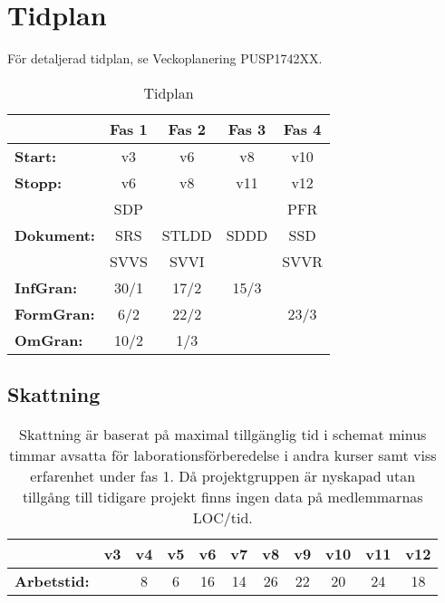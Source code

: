 \documentclass[paper=a4, fontsize=11pt,twoside]{article}
\begin{document}
\section{Tidplan}
För detaljerad tidplan, se Veckoplanering PUSP1742XX. %

\begin{table}[H]
\centering
\begin{tabular}{| l | c | c | c | c |} %
\hline
 & \textbf{Fas 1} & \textbf{Fas 2} & \textbf{Fas 3} & \textbf{Fas 4}\\
\hline
\hline
\textbf{Start:} & v3 & v6 & v8 & v10 \\
\hline
\textbf{Stopp:} & v6 & v8 & v11 & v12 \\
\hline
 				& SDP & & & PFR \\
\textbf{Dokument:} & SRS & STLDD & SDDD & SSD \\
 				& SVVS & SVVI & & SVVR \\
\hline
\textbf{InfGran:} & 30/1 & 17/2 & 15/3 & 	 \\
\hline
\textbf{FormGran:} & 6/2 & 22/2 &	 & 23/3 \\
\hline
\textbf{OmGran:} & 10/2 & 1/3 &		 & \\
\hline
\end{tabular}
{ \fontsize{6pt}{0.2cm}\selectfont \caption{Tidplan}}
\end{table}


\subsection*{Skattning}
\begin{table}[H]
\centering
\begin{tabular}{| l | c | c | c | c | c | c | c | c | c | c |}
\hline
 & \textbf{v3} & \textbf{v4} & \textbf{v5} & \textbf{v6} & \textbf{v7} & \textbf{v8} & \textbf{v9} & \textbf{v10} & \textbf{v11} & \textbf{v12}\\
\hline
\textbf{Arbetstid:}  &  & 8 & 6 & 16 & 14 & 26 & 22 & 20 & 24 & 18 \\
\hline
\end{tabular}\\
{ \fontsize{6pt}{0.2cm}\selectfont \caption{Skattning är baserat på maximal tillgänglig tid i schemat minus timmar avsatta för laborationsförberedelse i andra kurser samt viss erfarenhet under fas 1. Då projektgruppen är nyskapad utan tillgång till tidigare projekt finns ingen data på medlemmarnas LOC/tid.}}
\end{table}
\end{document}
